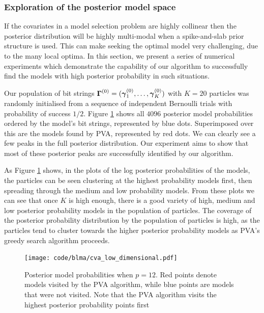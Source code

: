 \subsubsection{Exploration of the posterior model space}

If the covariates in a model selection problem are highly collinear then the
posterior distribution will be highly multi-modal when a spike-and-slab prior
structure is used. This can make seeking the optimal model very challenging,
due to the many local optima. In this section, we present a series of numerical
experiments which demonstrate the capability of our algorithm to successfully
find the models with high posterior probability in such situations.

Our population of bit strings ${\boldsymbol \Gamma}^{(0)} = ({\boldsymbol \gamma}_1^{(0)}, \ldots,
{\boldsymbol \gamma}_K^{(0)})$ with $K = 20$ particles was randomly initialised from a
sequence of independent Bernoulli trials with probability of success $1/2$.
Figure \ref{fig:PVA_posterior_models} shows all $4096$ posterior model
probabilities ordered by the model's bit strings, represented by blue dots.
Superimposed over this are the models found by PVA, represented by red dots.
We can clearly see a few peaks in the full posterior distribution. Our
experiment aims to show that most of these posterior peaks are successfully
identified by our algorithm.

As Figure \ref{fig:PVA_posterior_models} shows, in the plots of the log
posterior probabilities of the models, the particles can be seen clustering at
the highest probability models first, then spreading through the medium and low
probability models. From these plots we can see that once $K$ is high enough,
there is a good variety of high, medium and low posterior probability models in
the population of particles. The coverage of the posterior probability
distribution by the population of particles is high, as the particles tend to
cluster towards the higher posterior probability models as PVA's greedy search
algorithm proceeds.


\begin{figure}	
	\texttt{[image: code/blma/cva\_low\_dimensional.pdf]}
	\caption{Posterior model probabilities when $p = 12$. Red points denote models visited by the PVA
						algorithm, while blue points are models that were not visited. Note that the PVA algorithm
						visits the highest posterior probability points first}
	\label{fig:PVA_posterior_models}
\end{figure}

